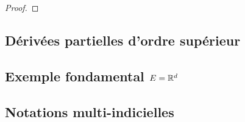 \begin{proof}

\end{proof}

\subsection{Dérivées partielles d'ordre supérieur}

\subsection{Exemple fondamental $E = \mathbb{R}^{d}$}

\subsection{Notations multi-indicielles}

